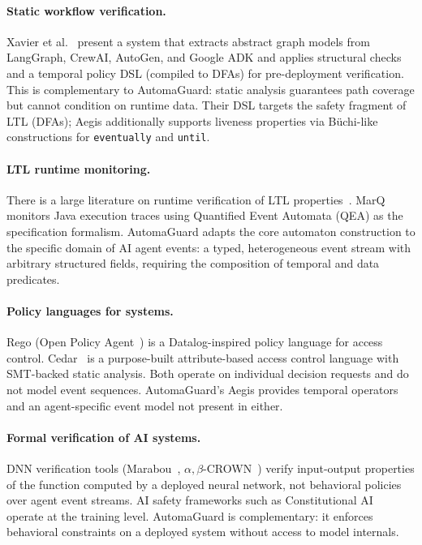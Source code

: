 \documentclass[sigconf]{acmart}
\begin{document}
\paragraph{Static workflow verification.}
Xavier et al.~\cite{xavier2026agentproof} present a system that extracts
abstract graph models from LangGraph, CrewAI, AutoGen, and Google ADK and
applies structural checks and a temporal policy DSL (compiled to DFAs) for
pre-deployment verification. This is complementary to AutomaGuard: static
analysis guarantees path coverage but cannot condition on runtime data.
Their DSL targets the safety fragment of LTL (DFAs); Aegis additionally
supports liveness properties via Büchi-like constructions for
\texttt{eventually} and \texttt{until}.

\paragraph{LTL runtime monitoring.}
There is a large literature on runtime verification of LTL
properties~\cite{leucker2009brief,havelund2004efficient}. MarQ~\cite{reger2015marq}
monitors Java execution traces using Quantified Event Automata (QEA) as the
specification formalism.
AutomaGuard adapts the core automaton construction to the specific domain of AI
agent events: a typed, heterogeneous event stream with arbitrary structured
fields, requiring the composition of temporal and data predicates.

\paragraph{Policy languages for systems.}
Rego (Open Policy Agent~\cite{toews2021opa}) is a Datalog-inspired policy
language for access control. Cedar~\cite{cedar2023} is a purpose-built
attribute-based access control language with SMT-backed static analysis.
Both operate on individual decision requests and do not model event sequences.
AutomaGuard's Aegis provides temporal operators and an agent-specific event
model not present in either.

\paragraph{Formal verification of AI systems.}
DNN verification tools (Marabou~\cite{katz2019marabou},
$\alpha,\beta$-CROWN~\cite{xu2021fast,wang2021betacrown})
verify input-output properties of the function computed by a deployed neural
network, not behavioral policies over agent event streams. AI safety frameworks such as Constitutional AI~\cite{bai2022constitutional}
operate at the training level. AutomaGuard is complementary: it enforces
behavioral constraints on a deployed system without access to model internals.
\end{document}
